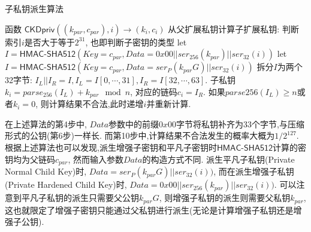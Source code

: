  
 
\begin{algorithm}[h]\footnotesize
\caption{子私钥派生算法}\label{algo-drc-priv}
  	\begin{algorithmic}[1]
	    \STATE 函数 $\textsf{CKDpriv}((k_{par}, c_{par}), i) \rightarrow (k_i, c_i)$ 从父扩展私钥计算子扩展私钥:
		\STATE 判断索引$i$是否大于等于$2^{31}$, 也即判断子密钥的类型
			\STATE let $I = \textsf{HMAC-SHA512}(Key = c_{par}, Data = 0x00 || ser_{256}(k_{par}) || ser_{32}(i))$
		\ELSE
			\STATE let $I = \textsf{HMAC-SHA512}(Key = c_{par}, Data = ser_P(k_{par}G) || ser_{32}(i))$
		\ENDIF
		\STATE 拆分$I$为两个32字节: $I_L || I_R = I, I_L = I[0,\cdots,31], I_R = I[32, \cdots, 63]$.
		\STATE 子私钥 $k_i = parse_{256}(I_L) + k_{par} \mod n $, 对应的链码$c_i = I_R$.
		\STATE 如果$parse256(I_L) \geq n$或者$k_i = 0$, 则计算结果不合法,此时递增$i$并重新计算.
    \end{algorithmic}
\end{algorithm}

在上述算法的第4步中, $Data$参数中的前缀$0x00$字节将私钥补齐为33个字节,与压缩形式的公钥(第6步)一样长.
而第10步中,计算结果不合法发生的概率大概为$1/2^{127}$.
根据上述算法也可以发现,派生增强子密钥和平凡子密钥时$\textsf{HMAC-SHA512}$计算的密钥均为父链码$c_{par}$,
然而输入参数$Data$的构造方式不同.
派生平凡子私钥(Private Normal Child Key)时, $Data = ser_P(k_{par}G) || ser_{32}(i))$,
而在派生增强子私钥(Private Hardened Child Key)时, $Data = 0x00 || ser_{256}(k_{par}) || ser_{32}(i))$.
可以注意到平凡子私钥的派生只需要父公钥$k_{par}G$, 则增强子私钥的派生则需要父私钥$k_{par}$,
这也就限定了增强子密钥只能通过父私钥进行派生(无论是计算增强子私钥还是增强子公钥).



